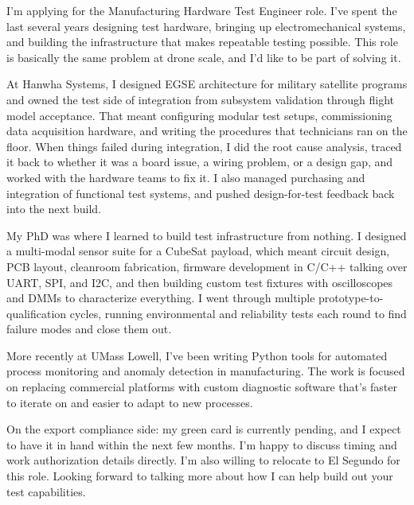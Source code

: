 \documentclass[letterpaper,11pt]{moderncv}
\date{\today}
\begin{document}
\makelettertitle

I'm applying for the Manufacturing Hardware Test Engineer role. I've spent the last several years designing test hardware, bringing up electromechanical systems, and building the infrastructure that makes repeatable testing possible. This role is basically the same problem at drone scale, and I'd like to be part of solving it.

At Hanwha Systems, I designed EGSE architecture for military satellite programs and owned the test side of integration from subsystem validation through flight model acceptance. That meant configuring modular test setups, commissioning data acquisition hardware, and writing the procedures that technicians ran on the floor. When things failed during integration, I did the root cause analysis, traced it back to whether it was a board issue, a wiring problem, or a design gap, and worked with the hardware teams to fix it. I also managed purchasing and integration of functional test systems, and pushed design-for-test feedback back into the next build.

My PhD was where I learned to build test infrastructure from nothing. I designed a multi-modal sensor suite for a CubeSat payload, which meant circuit design, PCB layout, cleanroom fabrication, firmware development in C/C++ talking over UART, SPI, and I2C, and then building custom test fixtures with oscilloscopes and DMMs to characterize everything. I went through multiple prototype-to-qualification cycles, running environmental and reliability tests each round to find failure modes and close them out.

More recently at UMass Lowell, I've been writing Python tools for automated process monitoring and anomaly detection in manufacturing. The work is focused on replacing commercial platforms with custom diagnostic software that's faster to iterate on and easier to adapt to new processes.

On the export compliance side: my green card is currently pending, and I expect to have it in hand within the next few months. I'm happy to discuss timing and work authorization details directly. I'm also willing to relocate to El Segundo for this role. Looking forward to talking more about how I can help build out your test capabilities.

\makeletterclosing
\end{document}
